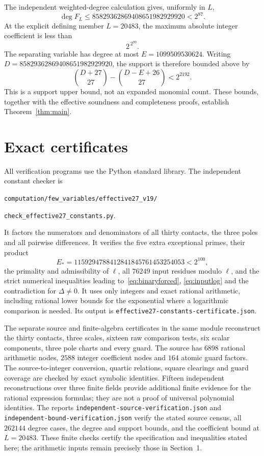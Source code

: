 \documentclass[11pt,a4paper]{article}
\begin{document}
The independent weighted-degree calculation gives, uniformly in $L$,
\begin{equation}\label{eq:degree}
 \deg F_L\le85829362869408651982929920<2^{87}.
\end{equation}
At the explicit defining member $L=20483$, the maximum absolute
integer coefficient is less than
\begin{equation}\label{eq:coefficients}
                                  2^{\,2^{99}}.
\end{equation}
The separating variable has degree at most $E=1099509530624$.
Writing $D=85829362869408651982929920$, the support is therefore
bounded above by
\[
          \binom{D+27}{27}-\binom{D-E+26}{27}<2^{2192}.
\]
This is a support upper bound, not an expanded monomial count. These bounds, together with
the effective soundness and completeness proofs, establish
Theorem~\ref{thm:main}.

\section{Exact certificates}\label{sec:certificate}

All verification programs use the Python standard library. The
independent constant checker is
\begin{center}
\nolinkurl{computation/few_variables/effective27_v19/}\par
\nolinkurl{check_effective27_constants.py}.
\end{center}
It factors the numerators and denominators of all thirty contacts,
the three poles and all pairwise differences. It verifies the
five extra exceptional primes, their product
\[
                         E_*=1159294788412841845761453254053<2^{100},
\]
the primality and admissibility of $\ell$, all $76249$ input
residues modulo $\ell$, and the strict numerical inequalities
leading to~\eqref{eq:binaryforced}, \eqref{eq:inputlog} and the
contradiction for $\Delta\ne0$. It uses only integers and exact
rational arithmetic, including rational lower bounds for the
exponential where a logarithmic comparison is needed. Its output is
\nolinkurl{effective27-constants-certificate.json}.

The separate source and finite-algebra certificates in the same
module reconstruct the thirty contacts, three scales, sixteen raw
comparison tests, six scalar components, three pole charts and every
guard. The source has $6898$ rational arithmetic nodes, $2588$
integer coefficient nodes and $164$ atomic guard factors. The
source-to-integer conversion, quartic relations, square clearings
and guard coverage are checked by exact symbolic identities.
Fifteen independent reconstructions over three finite fields provide
additional finite evidence for the rational expression formulas;
they are not a proof of universal polynomial identities. The reports
\nolinkurl{independent-source-verification.json} and
\nolinkurl{independent-bound-verification.json} verify the stated
source census, all $262144$ degree cases, the degree and support
bounds, and the coefficient bound at $L=20483$. These finite
checks certify the specification and inequalities stated here; the
arithmetic inputs remain precisely those in Section~1.
\end{document}
